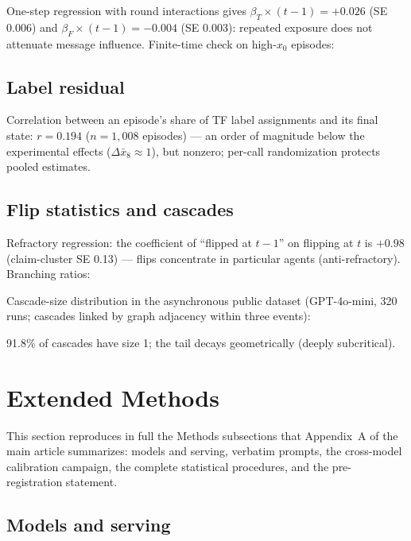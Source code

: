 \documentclass[11pt]{article}
\begin{document}
One-step regression with round interactions gives
$\beta_T \times (t-1) = +0.026$ (SE 0.006) and $\beta_F \times (t-1) =
-0.004$ (SE 0.003): repeated exposure does not attenuate message influence.
Finite-time check on high-$x_0$ episodes:
\begin{center}
\small

\end{center}

\subsection{Label residual}

Correlation between an episode's share of TF label assignments and its final
state: $r = 0.194$ ($n = 1{,}008$ episodes) --- an order of magnitude below
the experimental effects ($\Delta \bar x_8 \approx 1$), but nonzero;
per-call randomization protects pooled estimates.

\subsection{Flip statistics and cascades}

Refractory regression: the coefficient of ``flipped at $t-1$'' on flipping at
$t$ is $+0.98$ (claim-cluster SE 0.13) --- flips concentrate in particular
agents (anti-refractory). Branching ratios:
\begin{center}

\end{center}
Cascade-size distribution in the asynchronous public dataset (GPT-4o-mini,
320 runs; cascades linked by graph adjacency within three events):
\begin{center}

\end{center}
91.8\% of cascades have size 1; the tail decays geometrically (deeply
subcritical).

\section{Extended Methods}

This section reproduces in full the Methods subsections that Appendix~A of the main article
summarizes: models and serving, verbatim prompts, the cross-model
calibration campaign, the complete statistical procedures, and the
pre-registration statement.

\subsection{Models and serving}
\end{document}
